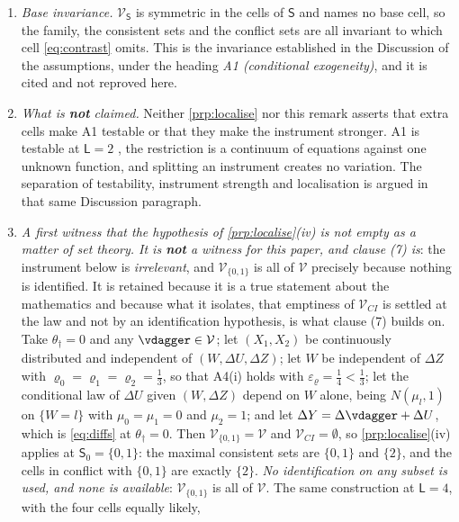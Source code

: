 \begin{remark}
\begin{enumerate}
read off a reference set fixed in advance; nothing here prices that.
\item[(4)] \emph{Base invariance.} $\mathcal V_{\mathsf S}$ is symmetric in the cells of $\mathsf S$ and
names no base cell, so the family, the consistent sets and the conflict sets are all invariant to which
cell \eqref{eq:contrast} omits. This is the invariance established in the Discussion of the assumptions,
under the heading \emph{A1 (conditional exogeneity)}, and it is cited and not reproved here.
\item[(5)] \emph{What is \textbf{not} claimed.} Neither \cref{prp:localise} nor this remark asserts that
extra cells make A1 testable or that they make the instrument stronger. A1 is testable at $\mathsf L=2$
, the restriction is a continuum of equations against one unknown function, and splitting an
instrument creates no variation. The separation of testability, instrument strength and localisation is
argued in that same Discussion paragraph.
\item[(6)] \emph{A first witness that the hypothesis of \cref{prp:localise}\textup{(iv)} is not empty as a
matter of set theory. It is \textbf{not} a witness for this paper, and clause \textup{(7)} is}: the
instrument below is \emph{irrelevant}, and $\mathcal V_{\{0,1\}}$ is all of $\mathcal V$ precisely because
nothing is identified. It is retained because it is a true statement about the mathematics and because
what it isolates, that emptiness of $\mathcal V_{CI}$ is settled at the law and not by an
identification hypothesis, is what clause \textup{(7)} builds on.
Take $\theta_\dagger=0$ and any $\vdagger\in\mathcal V$;
let $(X_1,X_2)$ be continuously distributed and independent of $(W,\Delta U,\Delta Z)$; let $W$ be
independent of $\Delta Z$ with $\varrho_0=\varrho_1=\varrho_2=\tfrac13$, so that A4(i) holds with
$\varepsilon_\varrho=\tfrac14<\tfrac13$; let the conditional law of $\Delta U$ given $(W,\Delta Z)$
depend on $W$ alone, being $N(\mu_l,1)$ on $\{W=l\}$ with $\mu_0=\mu_1=0$ and $\mu_2=1$; and let
$\Delta Y=\Delta\vdagger+\Delta U$, which is
\eqref{eq:diffs} at $\theta_\dagger=0$. Then $\mathcal V_{\{0,1\}}=\mathcal V$ and
$\mathcal V_{CI}=\emptyset$, so \cref{prp:localise}\textup{(iv)} applies at $\mathsf S_0=\{0,1\}$: the
maximal consistent sets are $\{0,1\}$ and $\{2\}$, and the cells in conflict with $\{0,1\}$ are exactly
$\{2\}$. \emph{No identification on any subset is used, and none is available}: $\mathcal V_{\{0,1\}}$
is all of $\mathcal V$. The same construction at $\mathsf L=4$, with the four cells equally likely,

\end{enumerate}
\end{remark}
